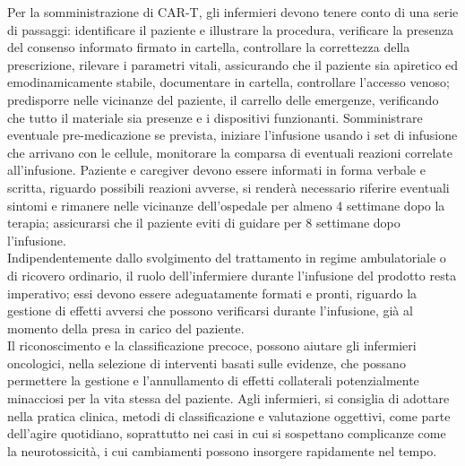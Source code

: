 Per la somministrazione di CAR-T, gli infermieri devono tenere conto di una serie di passaggi: identificare il paziente e 
illustrare la procedura, verificare la presenza del consenso informato firmato in cartella, controllare la correttezza 
della prescrizione, rilevare i parametri vitali, assicurando che il paziente sia apiretico ed emodinamicamente stabile, 
documentare in cartella, controllare l’accesso venoso; predisporre nelle vicinanze del paziente, il carrello delle 
emergenze, verificando che tutto il materiale sia presenze e i dispositivi funzionanti\cite{NURSINGCART}. 
Somministrare eventuale pre-medicazione se prevista, iniziare l’infusione usando i set di infusione che arrivano con 
le cellule, monitorare la comparsa di eventuali reazioni correlate all’infusione. 
Paziente e caregiver devono essere informati in forma verbale e scritta, riguardo possibili reazioni avverse, 
si renderà necessario riferire eventuali sintomi e rimanere nelle vicinanze dell’ospedale per almeno 4 settimane dopo 
la terapia; assicurarsi che il paziente eviti di guidare per 8 settimane dopo l’infusione\cite{NURSINGCART}.\\

Indipendentemente dallo svolgimento del trattamento in regime ambulatoriale o di ricovero ordinario, 
il ruolo dell’infermiere durante l’infusione del prodotto resta imperativo; essi devono essere adeguatamente 
formati e pronti, riguardo la gestione di  effetti avversi che possono verificarsi durante l’infusione, 
già al momento della presa in carico del paziente\cite{article2}.\\
Il riconoscimento e la classificazione precoce, possono aiutare gli infermieri oncologici, nella selezione di interventi 
basati sulle evidenze, che possano permettere la gestione e l’annullamento di effetti collaterali potenzialmente 
minacciosi per la vita stessa del paziente. Agli infermieri, si consiglia di adottare nella pratica clinica, 
metodi di classificazione e valutazione oggettivi, come parte dell’agire quotidiano, soprattutto nei 
casi in cui si sospettano complicanze come la neurotossicità, i cui cambiamenti possono insorgere 
rapidamente nel tempo\cite{article4}.\\

